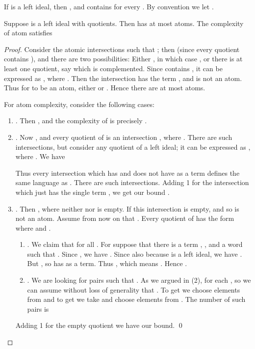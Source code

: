 \documentclass{llncs}
\newcommand{\be}{\begin{enumerate}}
\newcommand{\ee}{\end{enumerate}}
\begin{document}
If  is a left ideal, then , and  contains  for every . By convention we let . 



 
\label{sec:left_bounds}
\begin{proposition}
\label{prop:bounds_left}
Suppose  is a left ideal with  quotients. Then  has at most  atoms. The  complexity  of atom  satisfies
      

\end{proposition}
\begin{proof}
Consider the atomic intersections  such that ; then  (since every quotient contains ), and there are two possibilities:
Either , in which case  , or there is at least one quotient, say  which is complemented. Since  contains , it can be expressed as , where . Then the intersection has the term , and  is not an atom.
Thus for  to be an atom, either   or . Hence there are at most  atoms.

For atom complexity, consider the following cases:
\be
\item
.
Then  , and the  complexity of  is precisely . 
\item
. 
 Now  , and
every quotient of  is an intersection , where 
.
There are  such intersections, but
consider any quotient  of a left ideal; it can be expressed as , where . 
We have 

Thus every  intersection  which has  and does not have  as a term defines the same language as . 
There are  such intersections. Adding 1 for the intersection which just has the single term , we get our bound .

\item
. Then , where neither  nor  is empty.
If   this intersection  is empty, and so is not an atom.
Assume from now on that .
Every quotient of  has the form  where  and .

	\be
	\item
	. We claim that  for all . For suppose that there is a term 		, ,  and a word  such that .
	Since , we have .
	Since also  because  is a left ideal,  we have
	. 
	But  , so  has  as a term.
   Thus , which means .
	Hence  .
	\item
	.
	We are looking for pairs  such that .
As we argued in (2),  for each , so we can assume without loss of generality that .
	To get  we choose  elements from  and to get  	we take  and choose  elements from .
	The number of such pairs is
	

		\ee
		Adding 1 for the empty quotient we have our bound. \qed
\ee
\end{proof}
\end{document}
